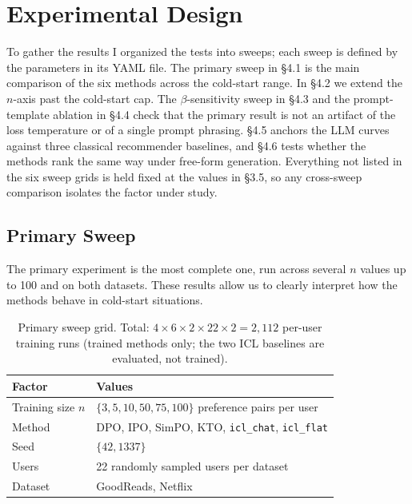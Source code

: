 
\section{Experimental Design}
\label{sec:design}

To gather the results I organized the tests into sweeps; each sweep is defined by the parameters in its YAML file. The primary sweep in \S4.1 is the main comparison of the six methods across the cold-start range. In \S4.2 we extend the $n$-axis past the cold-start cap. The $\beta$-sensitivity sweep in \S4.3 and the prompt-template ablation in \S4.4 check that the primary result is not an artifact of the loss temperature or of a single prompt phrasing. \S4.5 anchors the LLM curves against three classical recommender baselines, and \S4.6 tests whether the methods rank the same way under free-form generation. Everything not listed in the six sweep grids is held fixed at the values in \S3.5, so any cross-sweep comparison isolates the factor under study.


\subsection{Primary Sweep}
\label{sec:exp:primary}

The primary experiment is the most complete one, run across several $n$ values up to 100 and on both datasets. These results allow us to clearly interpret how the methods behave in cold-start situations.

\begin{table}[h]
\centering
\caption{Primary sweep grid. Total: $4 \times 6 \times 2 \times 22 \times 2 = 2{,}112$ per-user training runs (trained methods only; the two ICL baselines are evaluated, not trained).}
\label{tab:primary_grid}
\begin{tabular}{ll}
\toprule
\textbf{Factor} & \textbf{Values} \\
\midrule
Training size $n$ & $\{3, 5, 10, 50, 75, 100\}$ preference pairs per user \\
Method            & DPO, IPO, SimPO, KTO, \texttt{icl\_chat}, \texttt{icl\_flat} \\
Seed              & $\{42, 1337\}$ \\
Users             & 22 randomly sampled users per dataset \\
Dataset           & GoodReads, Netflix \\
\bottomrule
\end{tabular}
\end{table}


